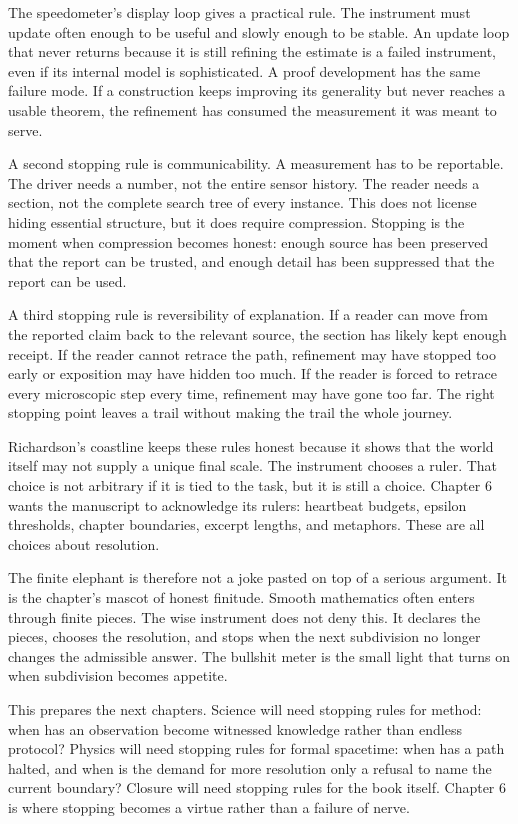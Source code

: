 The speedometer's display loop gives a practical rule. The instrument must
update often enough to be useful and slowly enough to be stable. An update loop
that never returns because it is still refining the estimate is a failed
instrument, even if its internal model is sophisticated. A proof development
has the same failure mode. If a construction keeps improving its generality but
never reaches a usable theorem, the refinement has consumed the measurement it
was meant to serve.

A second stopping rule is communicability. A measurement has to be reportable.
The driver needs a number, not the entire sensor history. The reader needs a
section, not the complete search tree of every instance. This does not license
hiding essential structure, but it does require compression. Stopping is the
moment when compression becomes honest: enough source has been preserved that
the report can be trusted, and enough detail has been suppressed that the
report can be used.

A third stopping rule is reversibility of explanation. If a reader can move
from the reported claim back to the relevant source, the section has likely
kept enough receipt. If the reader cannot retrace the path, refinement may have
stopped too early or exposition may have hidden too much. If the reader is
forced to retrace every microscopic step every time, refinement may have gone
too far. The right stopping point leaves a trail without making the trail the
whole journey.

Richardson's coastline keeps these rules honest because it shows that the
world itself may not supply a unique final scale. The instrument chooses a
ruler. That choice is not arbitrary if it is tied to the task, but it is still a
choice. Chapter 6 wants the manuscript to acknowledge its rulers: heartbeat
budgets, epsilon thresholds, chapter boundaries, excerpt lengths, and
metaphors. These are all choices about resolution.

The finite elephant is therefore not a joke pasted on top of a serious
argument. It is the chapter's mascot of honest finitude. Smooth mathematics
often enters through finite pieces. The wise instrument does not deny this. It
declares the pieces, chooses the resolution, and stops when the next
subdivision no longer changes the admissible answer. The bullshit meter is the
small light that turns on when subdivision becomes appetite.

This prepares the next chapters. Science will need stopping rules for method:
when has an observation become witnessed knowledge rather than endless
protocol? Physics will need stopping rules for formal spacetime: when has a
path halted, and when is the demand for more resolution only a refusal to name
the current boundary? Closure will need stopping rules for the book itself.
Chapter 6 is where stopping becomes a virtue rather than a failure of nerve.


